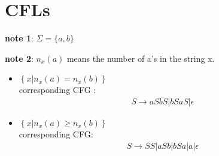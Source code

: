 \documentclass{article}
\begin{document}
\section{CFLs}

    \textbf{note 1}: $\Sigma=\{a,b\}$

    \textbf{note 2}: $n_x(a)$ means the number of a's in the string x.


    \begin{itemize}
        \item  $\left\{x| n_x(a)=n_x(b)\right\}$ \\ corresponding CFG : 
            \begin{align*}
                S \rightarrow aSbS | bSaS | \epsilon
            \end{align*}
        \item $\left\{x | n_x(a)\geq n_x(b)\right\}$ \\corresponding CFG:
            \begin{align*}
                S \rightarrow SS | aSb | bSa | a | \epsilon
            \end{align*}


\end{itemize}
\end{document}

